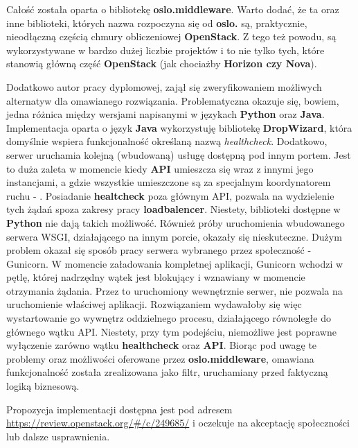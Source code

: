 Całość została oparta o bibliotekę \textbf{oslo.middleware}. Warto dodać, że ta oraz inne biblioteki, których nazwa
rozpoczyna się od \textbf{oslo.} są, praktycznie, nieodłączną częścią chmury obliczeniowej \textbf{OpenStack}. Z tego też powodu,
są wykorzystywane w bardzo dużej liczbie projektów i to nie tylko tych, które stanowią główną część \textbf{OpenStack} (jak chociażby
\textbf{Horizon czy \textbf{Nova}}).

Dodatkowo autor pracy dyplomowej, zajął się zweryfikowaniem możliwych alternatyw dla omawianego
rozwiązania. Problematyczna okazuje się, bowiem, jedna różnica między wersjami napisanymi w językach \textbf{Python} oraz \textbf{Java}.
Implementacja oparta o język \textbf{Java} wykorzystuję bibliotekę \textbf{DropWizard}, która domyślnie wspiera funkcjonalność określaną
nazwą \textit{healthcheck}. Dodatkowo, serwer uruchamia kolejną (wbudowaną) usługę dostępną pod innym portem.
Jest to duża zaleta w momencie kiedy \textbf{API} umieszcza się wraz z innymi jego instancjami, a gdzie wszystkie umieszczone są
za specjalnym koordynatorem ruchu - . Posiadanie \textbf{healtcheck} poza głównym API, pozwala
na wydzielenie tych żądań spoza zakresy pracy \textbf{loadbalencer}. Niestety, biblioteki dostępne w \textbf{Python} nie dają takich możliwość.
Również próby uruchomienia wbudowanego serwera WSGI, działającego na innym porcie, okazały się nieskuteczne. Dużym problem okazał się
sposób pracy serwera  wybranego przez społeczność - Gunicorn. W momencie załadowania kompletnej aplikacji, Gunicorn
wchodzi w pętlę, której nadrzędny wątek jest blokujący i wznawiany w momencie otrzymania żądania. Przez to uruchomiony wewnętrznie serwer, nie
pozwala na uruchomienie właściwej aplikacji. Rozwiązaniem wydawałoby się więc wystartowanie go wywnętrz oddzielnego procesu, działającego równoległe
do głównego wątku API. Niestety, przy tym podejściu, niemożliwe jest poprawne wyłączenie zarówno wątku \textbf{healthcheck} oraz \textbf{API}.
Biorąc pod uwagę te problemy oraz możliwości oferowane przez \textbf{oslo.middleware}, omawiana funkcjonalność została zrealizowana jako filtr,
uruchamiany przed faktyczną logiką biznesową. 


Propozycja implementacji dostępna jest pod adresem \url{https://review.openstack.org/#/c/249685/} i oczekuje na akceptację 
społeczności lub dalsze usprawnienia.